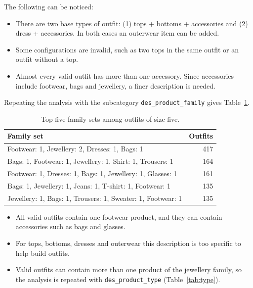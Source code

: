 \documentclass[10pt,a4paper,twocolumn]{article}
\newcommand{\code}[1]{\texttt{\small #1}}
\begin{document}
\noindent The following can be noticed:
\begin{itemize}
\item There are two base types of outfit: (1) tops + bottoms + accessories and (2) dress + accessories. In both cases an outerwear item can be added.
\item Some configurations are invalid, such as two tops in the same outfit or an outfit without a top.
\item Almost every valid outfit has more than one accessory. Since accessories include footwear, bags and jewellery, a finer description is needed.
\end{itemize}

Repeating the analysis with the subcategory \code{des\_product\_family} gives Table~\ref{tab:family}.

\begin{table}[tb]
\centering\small
\begin{tabularx}{\columnwidth}{>{\raggedright\arraybackslash}Xr}
\toprule
Family set & Outfits \\
\midrule
Footwear: 1, Jewellery: 2, Dresses: 1, Bags: 1 & 417 \\
Bags: 1, Footwear: 1, Jewellery: 1, Shirt: 1, Trousers: 1 & 164 \\
Footwear: 1, Dresses: 1, Bags: 1, Jewellery: 1, Glasses: 1 & 161 \\
Bags: 1, Jewellery: 1, Jeans: 1, T-shirt: 1, Footwear: 1 & 135 \\
Jewellery: 1, Bags: 1, Trousers: 1, Sweater: 1, Footwear: 1 & 135 \\
\bottomrule
\end{tabularx}
\caption{Top five family sets among outfits of size five.}
\label{tab:family}
\end{table}

\begin{itemize}
\item All valid outfits contain one footwear product, and they can contain accessories such as bags and glasses.
\item For tops, bottoms, dresses and outerwear this description is too specific to help build outfits.
\item Valid outfits can contain more than one product of the jewellery family, so the analysis is repeated with \code{des\_product\_type} (Table~\ref{tab:type}).
\end{itemize}
\end{document}
